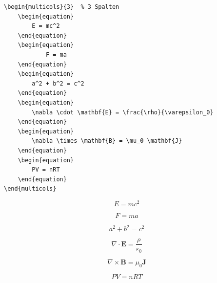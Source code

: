 \begin{lstlisting}[language={[LaTeX]TeX}, basicstyle=\small]
\begin{multicols}{3}  % 3 Spalten
    \begin{equation}
        E = mc^2
    \end{equation}
    \begin{equation}
            F = ma
    \end{equation}
    \begin{equation}
        a^2 + b^2 = c^2
    \end{equation}
    \begin{equation}
        \nabla \cdot \mathbf{E} = \frac{\rho}{\varepsilon_0}
    \end{equation}
    \begin{equation}
        \nabla \times \mathbf{B} = \mu_0 \mathbf{J}
    \end{equation}
    \begin{equation}
        PV = nRT
    \end{equation}
\end{multicols}
\end{lstlisting}

\begin{multicols}{3}  %
    \begin{equation}
        E = mc^2
    \end{equation}

    \begin{equation}
        F = ma
    \end{equation}

    \begin{equation}
        a^2 + b^2 = c^2
    \end{equation}

    \begin{equation}
        \nabla \cdot \mathbf{E} = \frac{\rho}{\varepsilon_0}
    \end{equation}

    \begin{equation}
        \nabla \times \mathbf{B} = \mu_0 \mathbf{J}
    \end{equation}

    \begin{equation}
        PV = nRT
    \end{equation}
\end{multicols}
